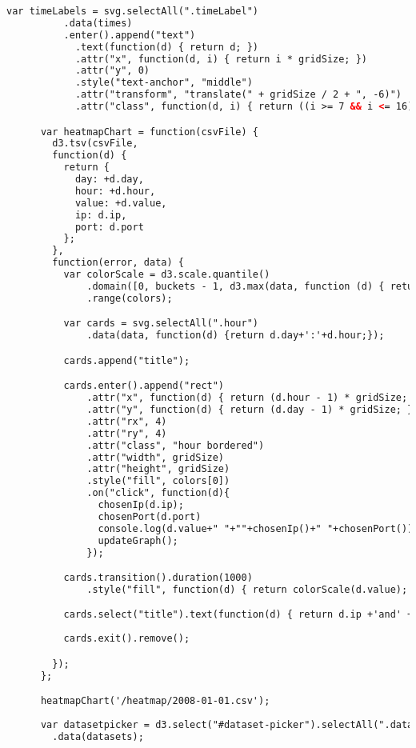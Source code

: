 \begin{lstlisting}[language=HTML]
      var timeLabels = svg.selectAll(".timeLabel")
          .data(times)
          .enter().append("text")
            .text(function(d) { return d; })
            .attr("x", function(d, i) { return i * gridSize; })
            .attr("y", 0)
            .style("text-anchor", "middle")
            .attr("transform", "translate(" + gridSize / 2 + ", -6)")
            .attr("class", function(d, i) { return ((i >= 7 && i <= 16) ? "timeLabel mono axis axis-worktime" : "timeLabel mono axis"); });

      var heatmapChart = function(csvFile) {
        d3.tsv(csvFile,
        function(d) {
          return {
            day: +d.day,
            hour: +d.hour,
            value: +d.value,
            ip: d.ip,
            port: d.port
          };
        },
        function(error, data) {
          var colorScale = d3.scale.quantile()
              .domain([0, buckets - 1, d3.max(data, function (d) { return d.value; })])
              .range(colors);

          var cards = svg.selectAll(".hour")
              .data(data, function(d) {return d.day+':'+d.hour;});

          cards.append("title");

          cards.enter().append("rect")
              .attr("x", function(d) { return (d.hour - 1) * gridSize; })
              .attr("y", function(d) { return (d.day - 1) * gridSize; })
              .attr("rx", 4)
              .attr("ry", 4)
              .attr("class", "hour bordered")
              .attr("width", gridSize)
              .attr("height", gridSize)
              .style("fill", colors[0])
              .on("click", function(d){
                chosenIp(d.ip);
                chosenPort(d.port)
                console.log(d.value+" "+""+chosenIp()+" "+chosenPort());
                updateGraph();
              });

          cards.transition().duration(1000)
              .style("fill", function(d) { return colorScale(d.value); });

          cards.select("title").text(function(d) { return d.ip +'and' + d.port+':'+d.value; });
          
          cards.exit().remove();

        });  
      };

      heatmapChart('/heatmap/2008-01-01.csv');
      
      var datasetpicker = d3.select("#dataset-picker").selectAll(".dataset-button")
        .data(datasets);


\end{lstlisting}

